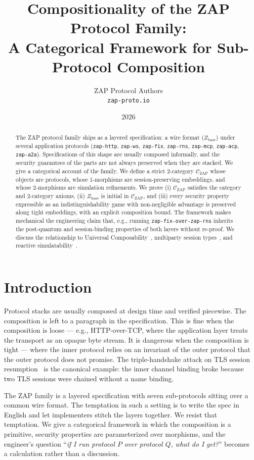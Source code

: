 \documentclass[11pt]{article}
\title{Compositionality of the ZAP Protocol Family:\\
A Categorical Framework for Sub-Protocol Composition}
\author{ZAP Protocol Authors\\\texttt{zap-proto.io}}
\date{2026}
\theoremstyle{definition}
\theoremstyle{remark}
\newcommand{\CZ}{\mathcal{C}_{\mathrm{ZAP}}}
\newcommand{\Zb}{Z_{\mathrm{base}}}
\begin{document}
\maketitle

\begin{abstract}
The ZAP protocol family ships as a layered specification: a wire format
($\Zb$) under several application protocols (\texttt{zap-http},
\texttt{zap-ws}, \texttt{zap-fix}, \texttt{zap-rns}, \texttt{zap-mcp},
\texttt{zap-acp}, \texttt{zap-a2a}). Specifications of this shape are
usually composed informally, and the security guarantees of the parts
are not always preserved when they are stacked. We give a categorical
account of the family. We define a strict 2-category $\CZ$ whose
objects are protocols, whose 1-morphisms are session-preserving
embeddings, and whose 2-morphisms are simulation refinements. We prove
(i) $\CZ$ satisfies the category and 2-category axioms, (ii) $\Zb$ is
initial in $\CZ$, and (iii) every security property expressible as an
indistinguishability game with non-negligible advantage is preserved
along tight embeddings, with an explicit composition bound. The
framework makes mechanical the engineering claim that, e.g., running
\texttt{zap-fix-over-zap-rns} inherits the post-quantum and
session-binding properties of both layers without re-proof. We discuss
the relationship to Universal Composability~\cite{canetti2020uc},
multiparty session types~\cite{honda2016multiparty}, and reactive
simulatability~\cite{pfitzmann2001model}.
\end{abstract}

\section{Introduction}
\label{sec:intro}

Protocol stacks are usually composed at design time and verified
piecewise. The composition is left to a paragraph in the specification.
This is fine when the composition is loose --- e.g., HTTP-over-TCP,
where the application layer treats the transport as an opaque byte
stream. It is dangerous when the composition is tight --- where the
inner protocol relies on an invariant of the outer protocol that the
outer protocol does not promise. The triple-handshake attack on TLS
session resumption~\cite{bhargavan2014triple} is the canonical example:
the inner channel binding broke because two TLS sessions were chained
without a name binding.

The ZAP family is a layered specification with seven sub-protocols
sitting over a common wire format. The temptation in such a setting
is to write the spec in English and let implementers stitch the layers
together. We resist that temptation. We give a categorical framework
in which the composition is a primitive, security properties are
parameterized over morphisms, and the engineer's question
``\emph{if I run protocol $P$ over protocol $Q$, what do I get?}''
becomes a calculation rather than a discussion.
\end{document}
